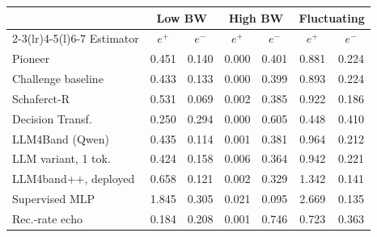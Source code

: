 \begin{tabular}{@{}l@{\hspace{4pt}}cc@{\hspace{6pt}}cc@{\hspace{6pt}}cc@{}}
\toprule
& \multicolumn{2}{c}{Low BW} & \multicolumn{2}{c}{High BW} & \multicolumn{2}{c}{Fluctuating} \\ \cmidrule(lr){2-3}\cmidrule(lr){4-5}\cmidrule(l){6-7}
Estimator & $e^{+}$ & $e^{-}$ & $e^{+}$ & $e^{-}$ & $e^{+}$ & $e^{-}$ \\
\midrule
Pioneer & 0.451 & 0.140 & 0.000 & 0.401 & 0.881 & 0.224 \\
Challenge baseline & 0.433 & 0.133 & 0.000 & 0.399 & 0.893 & 0.224 \\
Schaferct-R & 0.531 & 0.069 & 0.002 & 0.385 & 0.922 & 0.186 \\
Decision Transf. & 0.250 & 0.294 & 0.000 & 0.605 & 0.448 & 0.410 \\
LLM4Band (Qwen) & 0.435 & 0.114 & 0.001 & 0.381 & 0.964 & 0.212 \\
LLM variant, 1 tok. & 0.424 & 0.158 & 0.006 & 0.364 & 0.942 & 0.221 \\
LLM4band++, deployed & 0.658 & 0.121 & 0.002 & 0.329 & 1.342 & 0.141 \\
\midrule
Supervised MLP & 1.845 & 0.305 & 0.021 & 0.095 & 2.669 & 0.135 \\
Rec.-rate echo & 0.184 & 0.208 & 0.001 & 0.746 & 0.723 & 0.363 \\
\bottomrule
\end{tabular}
